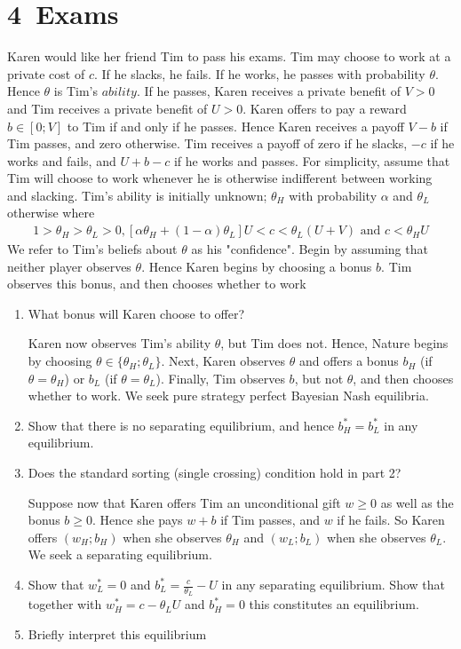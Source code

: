 \documentclass[a4paper]{article}
\begin{document}
\section*{4\ Exams}
Karen would like her friend Tim to pass his exams. Tim may choose to work at a
private cost of $c$. If he slacks, he fails. If he works, he passes with probability $\theta$. Hence $\theta$
is Tim's $ability$. If he passes, Karen receives a private benefit of $V > 0$ and Tim receives
a private benefit of $U > 0$.
Karen offers to pay a reward $b \in [0; V]$ to Tim if and only if he passes. Hence Karen
receives a payoff $V-b$ if Tim passes, and zero otherwise. Tim receives a payoff of zero if
he slacks, $-c$ if he works and fails, and $U + b-c$ if he works and passes. For simplicity,
assume that Tim will choose to work whenever he is otherwise indifferent between working
and slacking.
Tim's ability is initially unknown; $\theta_H$ with probability $\alpha$ and $\theta_L$ otherwise where
\begin{align*}
1 > \theta_H > \theta_L > 0, [\alpha \theta_H + (1-\alpha)\theta_L] U < c < \theta_L(U + V ) \text{ and } c < \theta_H U
\end{align*}
We refer to Tim's beliefs about $\theta$ as his "confidence". Begin by assuming that neither
player observes $\theta$. Hence Karen begins by choosing a bonus $b$. Tim observes this bonus,
and then chooses whether to work
\begin{enumerate}
	\item What bonus will Karen choose to offer?
	
	
	Karen now observes Tim's ability $\theta$, but Tim does not. Hence, Nature begins by
	choosing $\theta \in \{\theta_H; \theta_L\}$. Next, Karen observes $\theta$ and offers a bonus $b_H$ (if $\theta = \theta_H$) or $b_L$
	(if $\theta = \theta_L$). Finally, Tim observes $b$, but not $\theta$, and then chooses whether to work. We seek pure strategy perfect Bayesian Nash equilibria.
	\item Show that there is no separating equilibrium, and hence $b^*_H = b^*_L$ in any equilibrium.
	\item Does the standard sorting (single crossing) condition hold in part 2?
	
	
	Suppose now that Karen offers Tim an unconditional gift $w \ge 0$ as well as the bonus
	$b \ge 0$. Hence she pays $w+b$ if Tim passes, and $w$ if he fails. So Karen offers $(w_H; b_H)$ when
	she observes $\theta_H$ and $(w_L; b_L)$ when she observes $\theta_L$. We seek a separating equilibrium.
	
	
	\item Show that $w^*_L = 0$ and $b^*_L = \frac{c}{\theta_L} - U$ in any separating equilibrium. Show that
	together with $w^*_H = c - \theta_LU$ and $b_H^* = 0$ this constitutes an equilibrium.
	\item Briefly interpret this equilibrium
\end{enumerate}
\end{document}

